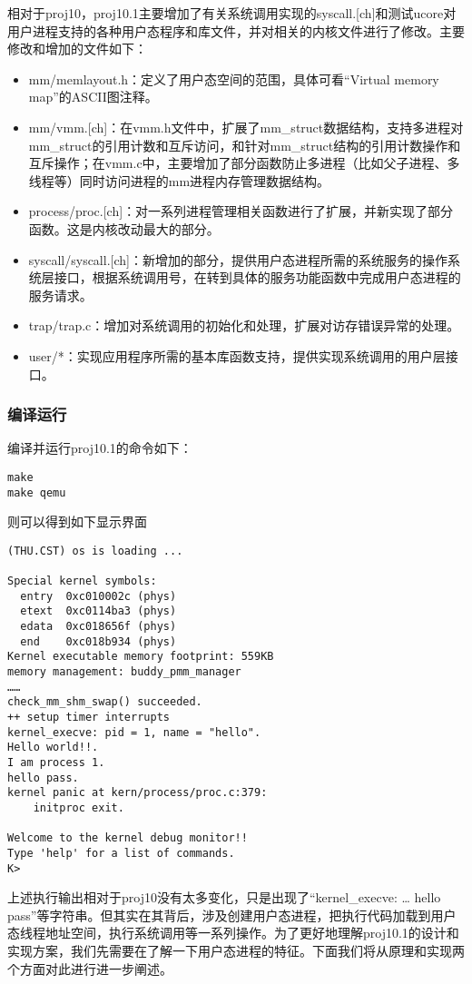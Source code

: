 相对于proj10，proj10.1主要增加了有关系统调用实现的syscall.{[}ch{]}和测试ucore对用户进程支持的各种用户态程序和库文件，并对相关的内核文件进行了修改。主要修改和增加的文件如下：

\begin{itemize}
\tightlist
\item
  mm/memlayout.h：定义了用户态空间的范围，具体可看``Virtual memory
  map''的ASCII图注释。
\item
  mm/vmm.{[}ch{]}：在vmm.h文件中，扩展了mm\_struct数据结构，支持多进程对mm\_struct的引用计数和互斥访问，和针对mm\_struct结构的引用计数操作和互斥操作；在vmm.c中，主要增加了部分函数防止多进程（比如父子进程、多线程等）同时访问进程的mm进程内存管理数据结构。
\item
  process/proc.{[}ch{]}：对一系列进程管理相关函数进行了扩展，并新实现了部分函数。这是内核改动最大的部分。
\item
  syscall/syscall.{[}ch{]}：新增加的部分，提供用户态进程所需的系统服务的操作系统层接口，根据系统调用号，在转到具体的服务功能函数中完成用户态进程的服务请求。
\item
  trap/trap.c：增加对系统调用的初始化和处理，扩展对访存错误异常的处理。
\item
  user/*：实现应用程序所需的基本库函数支持，提供实现系统调用的用户层接口。
\end{itemize}

\subsubsection{编译运行}\label{ux7f16ux8bd1ux8fd0ux884c}

编译并运行proj10.1的命令如下：

\begin{lstlisting}
make
make qemu
\end{lstlisting}

则可以得到如下显示界面

\begin{lstlisting}
(THU.CST) os is loading ...

Special kernel symbols:
  entry  0xc010002c (phys)
  etext  0xc0114ba3 (phys)
  edata  0xc018656f (phys)
  end    0xc018b934 (phys)
Kernel executable memory footprint: 559KB
memory management: buddy_pmm_manager
……
check_mm_shm_swap() succeeded.
++ setup timer interrupts
kernel_execve: pid = 1, name = "hello".
Hello world!!.
I am process 1.
hello pass.
kernel panic at kern/process/proc.c:379:
    initproc exit.

Welcome to the kernel debug monitor!!
Type 'help' for a list of commands.
K>
\end{lstlisting}

上述执行输出相对于proj10没有太多变化，只是出现了``kernel\_execve:
\ldots{} hello
pass''等字符串。但其实在其背后，涉及创建用户态进程，把执行代码加载到用户态线程地址空间，执行系统调用等一系列操作。为了更好地理解proj10.1的设计和实现方案，我们先需要在了解一下用户态进程的特征。下面我们将从原理和实现两个方面对此进行进一步阐述。
